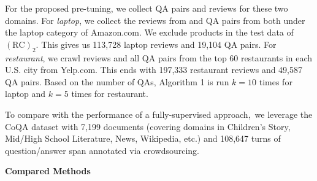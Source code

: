 \begin{table}
    \centering
\label{chap6:tbl:rcrc}
\caption{Statistics of $(\text{RC})_2$ Datasets.}
\vspace{-5mm}
\end{table}

For the proposed pre-tuning, we collect QA pairs and reviews for these two domains.
For \emph{laptop}, we collect the reviews from \cite{he2016ups} and QA pairs from \cite{Xu2018pro} both under the laptop category of Amazon.com. We exclude products in the test data of $(\text{RC})_2$.
This gives us 113,728 laptop reviews and 19,104 QA pairs. 
For \emph{restaurant}, we crawl reviews and all QA pairs from the top 60 restaurants in each U.S. city from Yelp.com.
This ends with 197,333 restaurant reviews and 49,587 QA pairs. Based on the number of QAs, Algorithm 1 is run $k=10$ times for laptop and $k=5$ times for restaurant.

To compare with the performance of a fully-supervised approach,~we leverage the CoQA dataset with 7,199 documents (covering domains in Children’s Story, Mid/High School Literature, News, Wikipedia, etc.) and 108,647 turns of question/answer span annotated via crowdsourcing.

\textbf{Compared Methods}

